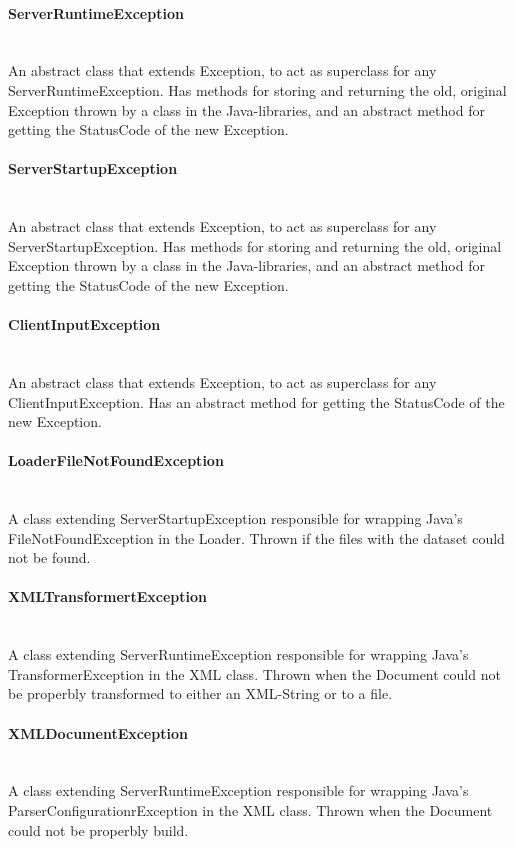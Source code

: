 \documentclass[a4paper,10pt,titlepage]{article}
\begin{document}
				\paragraph{ServerRuntimeException}\mbox{}\\
An abstract class that extends Exception, to act as superclass for any ServerRuntimeException. Has methods for storing and returning the old, original Exception thrown by a class in the Java-libraries, and an abstract method for getting the StatusCode of the new Exception.
				
				\paragraph{ServerStartupException}\mbox{}\\
An abstract class that extends Exception, to act as superclass for any ServerStartupException. Has methods for storing and returning the old, original Exception thrown by a class in the Java-libraries, and an abstract method for getting the StatusCode of the new Exception.

				\paragraph{ClientInputException}\mbox{}\\
An abstract class that extends Exception, to act as superclass for any ClientInputException. Has an abstract method for getting the StatusCode of the new Exception.

				\paragraph{LoaderFileNotFoundException}\mbox{}\\
A class extending ServerStartupException responsible for wrapping Java's FileNotFoundException in the Loader. Thrown if the files with the dataset could not be found.

				\paragraph{XMLTransformertException}\mbox{}\\
A class extending ServerRuntimeException responsible for wrapping Java's TransformerException in the XML class. Thrown when the Document could not be properbly transformed to either an XML-String or to a file.

				\paragraph{XMLDocumentException}\mbox{}\\
A class extending ServerRuntimeException responsible for wrapping Java's ParserConfigurationrException in the XML class. Thrown when the Document could not be properbly build.
				
\end{document}

